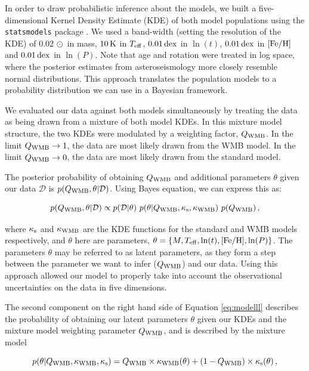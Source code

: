\documentclass[12pt]{article}
\newcommand{\teff}{\mbox{$T_{\rm eff}$}\xspace}
\newcommand{\feh}{\mbox{$\rm{[Fe/H]}$}\xspace}
\newcommand{\rtwo}[1]{{#1}}
\begin{document}
In order to draw probabilistic inference about the models, we built a five-dimensional Kernel Density Estimate (KDE) of both model populations using the \texttt{statsmodels} package \cite{seabold+perktold2010}. We used a band-width (setting the resolution of the KDE) of $0.02\, \odot$ in mass, $10\, \rm K$ in \teff, $0.01\, \rm{dex}$ in $\ln(t)$, $0.01\, \rm{dex}$ in $\rm{[Fe/H]}$ and $0.01\, \rm{dex}$ in $\ln(P)$. Note that age and rotation were treated in log space, where the posterior estimates from asteroseismology more closely resemble normal distributions. This approach translates the population models to a probability distribution we can use in a Bayesian framework.

We evaluated our data against both models simultaneously by treating the data as being drawn from a mixture of both model KDEs. In this mixture model structure, the two KDEs were modulated by a weighting factor, $Q_{\rm WMB}$. In the limit $Q_{\rm WMB} \rightarrow 1$, the data are most likely drawn from the WMB model. In the limit $Q_{\rm WMB} \rightarrow 0$, the data are most likely drawn from the standard model.

The posterior probability of obtaining $Q_{\rm WMB}$ and additional parameters $\theta$ given our data $\mathcal{D}$ is $p(Q_{\rm{WMB}}, \theta | \mathcal{D})$. Using Bayes equation, we can express this as:

\begin{equation}\label{eq:modelll}
	p(Q_{\rm{WMB}}, \theta | \mathcal{D}) \propto p(\mathcal{D} | \theta)\ p(\theta | Q_{\rm{WMB}}, \kappa_{\rm{s}}, \kappa_{\rm{WMB}})\ p(Q_{\rm{WMB}})\, ,
\end{equation}

\noindent where $\kappa_{\rm{s}}$ and $\kappa_{\rm{WMB}}$ are the KDE functions for the standard and WMB models respectively, and $\theta$ here are parameters, $\theta = \{M, \teff, \ln(t), \feh, \ln(P)\}$. The parameters $\theta$ may be referred to as latent parameters, as they form a step between the parameter we want to infer ($Q_{\rm{WMB}}$) and our data. Using this approach allowed our model to properly take into account the observational uncertainties on the data \rtwo{in five dimensions.}

The second component on the right hand side of Equation \ref{eq:modelll} describes the probability of obtaining our latent parameters $\theta$ given our KDEs and the mixture model weighting parameter $Q_{\rm WMB}$, and is described by the mixture model

\begin{equation}\label{eq:mixturell}
	p(\theta | Q_{\rm{WMB}}, \kappa_{\rm{WMB}}, \kappa_{\rm{s}}) = Q_{\rm WMB} \times \kappa_{\rm WMB}(\theta) + (1 - Q_{\rm WMB}) \times \kappa_{\rm s}(\theta)\, ,
\end{equation}
\end{document}
